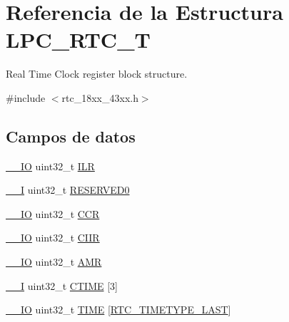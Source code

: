 \hypertarget{struct_l_p_c___r_t_c___t}{}\section{Referencia de la Estructura L\+P\+C\+\_\+\+R\+T\+C\+\_\+T}
\label{struct_l_p_c___r_t_c___t}


Real Time Clock register block structure.  




{\ttfamily \#include $<$rtc\+\_\+18xx\+\_\+43xx.\+h$>$}

\subsection*{Campos de datos}
\begin{DoxyCompactItemize}
\item 
\hyperlink{core__sc300_8h_aec43007d9998a0a0e01faede4133d6be}{\+\_\+\+\_\+\+IO} uint32\+\_\+t \hyperlink{struct_l_p_c___r_t_c___t_a1a7a495de3dd80cbc190910e7a60cfdd}{I\+LR}
\item 
\hyperlink{core__sc300_8h_af63697ed9952cc71e1225efe205f6cd3}{\+\_\+\+\_\+I} uint32\+\_\+t \hyperlink{struct_l_p_c___r_t_c___t_ad06839c5382047f4f9f2c74cc61db942}{R\+E\+S\+E\+R\+V\+E\+D0}
\item 
\hyperlink{core__sc300_8h_aec43007d9998a0a0e01faede4133d6be}{\+\_\+\+\_\+\+IO} uint32\+\_\+t \hyperlink{struct_l_p_c___r_t_c___t_a5e1322e27c40bf91d172f9673f205c97}{C\+CR}
\item 
\hyperlink{core__sc300_8h_aec43007d9998a0a0e01faede4133d6be}{\+\_\+\+\_\+\+IO} uint32\+\_\+t \hyperlink{struct_l_p_c___r_t_c___t_a5c2a7b9f2be3f9120dbf2c71024d1209}{C\+I\+IR}
\item 
\hyperlink{core__sc300_8h_aec43007d9998a0a0e01faede4133d6be}{\+\_\+\+\_\+\+IO} uint32\+\_\+t \hyperlink{struct_l_p_c___r_t_c___t_aea0f6edbd2ade9c0fbb7bd889b9c638c}{A\+MR}
\item 
\hyperlink{core__sc300_8h_af63697ed9952cc71e1225efe205f6cd3}{\+\_\+\+\_\+I} uint32\+\_\+t \hyperlink{struct_l_p_c___r_t_c___t_ad135ab5f27a442004aa76b6912c49bb1}{C\+T\+I\+ME} \mbox{[}3\mbox{]}
\item 
\hyperlink{core__sc300_8h_aec43007d9998a0a0e01faede4133d6be}{\+\_\+\+\_\+\+IO} uint32\+\_\+t \hyperlink{struct_l_p_c___r_t_c___t_adbcc88f3936d922774dd670f1c48ce3a}{T\+I\+ME} \mbox{[}\hyperlink{group___r_t_c__18_x_x__43_x_x_gga8144898fe628404d396db06dc8aac0e0a0d4fafef57b6ef363f9a0875ff339cad}{R\+T\+C\+\_\+\+T\+I\+M\+E\+T\+Y\+P\+E\+\_\+\+L\+A\+ST}\mbox{]}

\end{DoxyCompactItemize}
